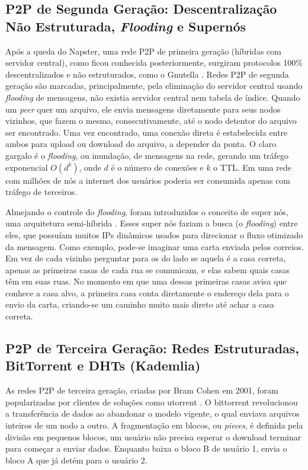 \subsection{P2P de Segunda Geração: Descentralização Não Estruturada, \textit{Flooding} e Supernós}

Após a queda do Napster, uma rede P2P de primeira geração (híbridas com
servidor central), como ficou conhecida posteriormente, surgiram protocolos
100\% descentralizados e não estruturados, como o Gnutella
\cite{ripeanu2001}. Redes P2P de segunda geração são marcadas,
principalmente, pela eliminação do servidor central usando \textit{flooding} de
mensagens, não existia servidor central nem tabela de índice. Quando um
\textit{peer} quer um arquivo, ele envia mensagens diretamente para seus nodos
vizinhos, que fazem o mesmo, consecutivamente, até o nodo detentor do
arquivo ser encontrado. Uma vez encontrado, uma conexão direta é
estabelecida entre ambos para upload ou download do arquivo, a depender da
ponta. O claro gargalo é o \textit{flooding}, ou inundação, de mensagens na rede,
gerando um tráfego exponencial $O(d^k)$, onde $d$ é o número de conexões e
$k$ o TTL. Em uma rede com milhões de nós a internet dos usuários poderia
ser consumida apenas com tráfego de terceiros.

Almejando o controle do \textit{flooding}, foram introduzidos o conceito de super
nós, uma arquitetura semi-híbrida \cite{saroiu2002,yanggarciamolina2003,liang2006}. Esses super nós faziam
a busca (o \textit{flooding}) entre eles, que possuíam muitos IPs dinâmicos usados
para direcionar o fluxo otimizado da mensagem. Como exemplo, pode-se
imaginar uma carta enviada pelos correios. Em vez de cada vizinho
perguntar para os do lado se aquela é a casa correta, apenas as primeiras
casas de cada rua se comunicam, e elas sabem quais casas têm em suas ruas.
No momento em que uma dessas primeiras casas avisa que conhece a casa alvo,
a primeira casa conta diretamente o endereço dela para o envio da carta,
criando-se um caminho muito mais direto até achar a casa correta.

\subsection{P2P de Terceira Geração: Redes Estruturadas, BitTorrent e DHTs (Kademlia)}

As redes P2P de terceira geração, criadas por Bram Cohen em 2001, foram
popularizadas por clientes de soluções como utorrent \cite{cohen2003}. O
bittorrent revolucionou a transferência de dados ao abandonar o modelo
vigente, o qual enviava arquivos inteiros de um nodo a outro. A
fragmentação em blocos, ou \textit{pieces}, é definida pela divisão em pequenos
blocos, um usuário não precisa esperar o download terminar para começar a
enviar dados. Enquanto baixa o bloco B de usuário 1, envia o bloco A que já
detém para o usuário 2.

